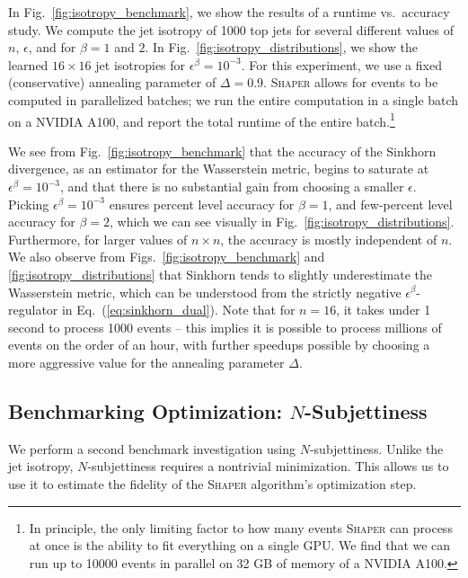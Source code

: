 \documentclass[letterpaper,11pt]{article}
\DeclareRobustCommand{\Fig}[1]{Fig.~\ref{fig:#1}}
\DeclareRobustCommand{\Figs}[2]{Figs.~\ref{fig:#1} and \ref{fig:#2}}
\DeclareRobustCommand{\Eq}[1]{Eq.~(\ref{eq:#1})}
\newcommand{\Shaper}{\textsc{Shaper}\xspace}
\begin{document}
In \Fig{isotropy_benchmark}, we show the results of a runtime vs.\ accuracy study. We compute the jet isotropy of 1000 top jets for several different values of $n$, $\epsilon$, and for $\beta = 1$ and $2$.
%
In \Fig{isotropy_distributions}, we show the learned $16\times16$ jet isotropies for $\epsilon^{\beta} = 10^{-3}$. For this experiment, we use a fixed (conservative) annealing parameter of $\Delta = 0.9$. \Shaper allows for events to be computed in parallelized batches; we run the entire computation in a single batch on a NVIDIA A100, and report the total runtime of the entire batch.\footnote{In principle, the only limiting factor to how many events \Shaper can process at once is the ability to fit everything on a single GPU. We find that we can run up to 10000 events in parallel on 32 GB of memory of a NVIDIA A100.} 





We see from \Fig{isotropy_benchmark} that the accuracy of the Sinkhorn divergence, as an estimator for the Wasserstein metric, begins to saturate at $\epsilon^\beta = 10^{-3}$, and that there is no substantial gain from choosing a smaller $\epsilon$. Picking $\epsilon^\beta = 10^{-3}$ ensures percent level accuracy for $\beta  = 1$, and few-percent level accuracy for $\beta = 2$, which we can see visually in \Fig{isotropy_distributions}. Furthermore, for larger values of $n\times n$, the accuracy is mostly independent of $n$. We also observe from \Figs{isotropy_benchmark}{isotropy_distributions} that Sinkhorn tends to slightly underestimate the Wasserstein metric, which can be understood from the strictly negative $\epsilon^\beta$-regulator in \Eq{sinkhorn_dual}. Note that for $n = 16$, it takes under 1 second to process 1000 events -- this implies it is possible to process millions of events on the order of an hour, with further speedups possible by choosing a more aggressive value for the annealing parameter $\Delta$.


\subsection{Benchmarking Optimization: $N$-Subjettiness}\label{sec:benchmarking_optimization}

We perform a second benchmark investigation using $N$-subjettiness. Unlike the jet isotropy, $N$-subjettiness requires a nontrivial minimization. This allows us to use it to estimate the fidelity of the \Shaper algorithm's optimization step.
\end{document}
